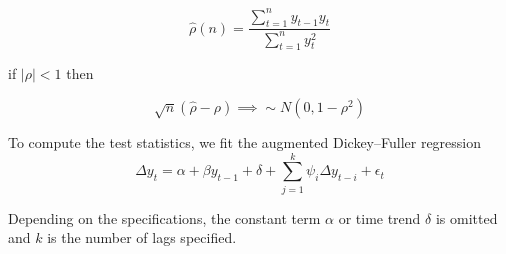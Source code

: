 \documentclass[
  11pt,
]{article}
\begin{document}
\[
\hat{\rho}(n) = \frac{\sum\limits_{t=1}^{n}y_{t-1}y_{t}}{\sum\limits_{t=1}^{n}y_{t}^{2}}
\]

if \(\left|\rho \right| < 1\) then

\[
\sqrt{n}\left(\hat{\rho} - \rho\right) \implies \sim{N}(0, 1 - \rho^{2})
\]

To compute the test statistics, we fit the augmented Dickey--Fuller
regression \[
\Delta y_{t} = \alpha + \beta y_{t-1} + \delta + \sum\limits_{j=1}^{k}\psi_{i}\Delta y_{t- i} + \epsilon_{t}
\]

Depending on the specifications, the constant term \(\alpha\) or time
trend \(\delta\) is omitted and \(k\) is the number of lags specified.

  
\end{document}
